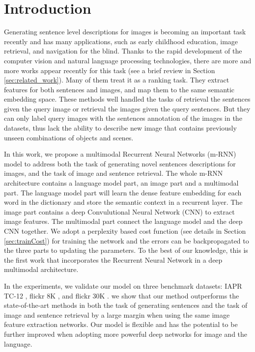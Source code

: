 
\section{Introduction}

Generating sentence level descriptions for images is becoming an important task recently and has many applications, such as early childhood education, image retrieval, and navigation for the blind.
Thanks to the rapid development of the computer vision and natural language processing technologies, there are more and more works appear recently for this task (see a brief review in Section \ref{sec:related_work}).
Many of them treat it as a ranking task.
They extract features for both sentences and images, and map them to the same semantic embedding space.
These methods well handled the tasks of retrieval the sentences given the query image or retrieval the images given the query sentences.
But they can only label query images with the sentences annotation of the images in the datasets, thus lack the ability to describe new image that contains previously unseen combinations of objects and scenes.

In this work, we propose a multimodal Recurrent Neural Networks (m-RNN) model to address both the task of generating novel sentences descriptions for images, and the task of image and sentence retrieval.
The whole m-RNN architecture contains a language model part, an image part and a multimodal part.
The language model part will learn the dense feature embedding for each word in the dictionary and store the semantic context in a recurrent layer.
The image part contains a deep Convulutional Neural Network (CNN) \cite{krizhevsky2012imagenet} to extract image features.
The multimodal part connect the language model and the deep CNN together.
We adopt a perplexity based cost function (see details in Section \ref{sec:trainCost}) for training the network and the errors can be backpropagated to the three parts to updating the parameters.
To the best of our knowledge, this is the first work that incorporates the Recurrent Neural Network in a deep multimodal architecture.

In the experiments, we validate our model on three benchmark datasets: IAPR TC-12 \cite{grubinger2006iapr}, flickr 8K \cite{rashtchian2010collecting}, and flickr 30K \cite{hodoshimage}.
we show that our method outperforms the state-of-the-art methods in both the task of generating sentences and the task of image and sentence retrieval by a large margin when using the same image feature extraction networks.
Our model is flexible and has the potential to be further improved when adopting more powerful deep networks for image and the language.